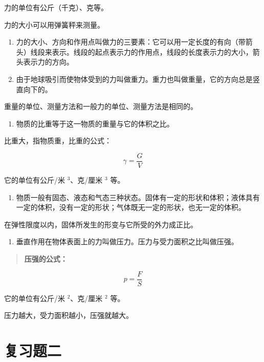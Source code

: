 力的单位有公斤（千克）、克等。

力的大小可以用弹簧秤来测量。

\begin{enumerate}
\def\labelenumi{\arabic{enumi}.}
\setcounter{enumi}{1}
\item
  力的大小、方向和作用点叫做力的三要素：它可以用一定长度的有向（带箭头）线段来表示。线段的起点表示力的作用点，线段的长度表示力的大小，箭头表示力的方向。
\item
  由于地球吸引而使物体受到的力叫做重力。重力也叫做重量，它的方向总是竖直向下的。
\end{enumerate}

重量的单位、测量方法和一般力的单位、测量方法是相同的。

\begin{enumerate}
\def\labelenumi{\arabic{enumi}.}
\setcounter{enumi}{3}
\tightlist
\item
  物质的比重等于这一物质的重量与它的体积之比。
\end{enumerate}

比重大，指物质重，比重的公式：

\[
\gamma = \frac {G}{V}
\]

它的单位有公斤/米 \(^{3}\)、克/厘米 \(^{3}\) 等。

\begin{enumerate}
\def\labelenumi{\arabic{enumi}.}
\setcounter{enumi}{4}
\tightlist
\item
  物质一般有固态、液态和气态三种状态。固体有一定的形状和体积；液体具有一定的体积，没有一定的形状；气体既无一定的形状，也无一定的体积。
\end{enumerate}

在弹性限度以内，固体所发生的形变与它所受的外力成正比。

\begin{enumerate}
\def\labelenumi{\arabic{enumi}.}
\setcounter{enumi}{5}
\tightlist
\item
  垂直作用在物体表面上的力叫做压力。压力与受力面积之比叫做压强。
\end{enumerate}

\begin{quote}
\textbf{压强的公式：}
\end{quote}

\[
p = \frac {F}{S}
\]

它的单位有公斤/米 \(^{2}\)、克/厘米 \(^{2}\) 等。

压力越大，受力面积越小，压强就越大。

\section{复习题二}\label{ux590dux4e60ux9898ux4e8c}


